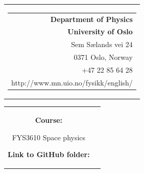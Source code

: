 


% 
{}
\thispagestyle{empty}
\begin{nopagebreak}
{\samepage 
\begin{tabular}{r}
\parbox{\textwidth}{  
\hfill \parbox{5.5cm}{\begin{tabular}{r} %
{\small \textbf{Department of Physics}}\\
{\small  \textbf{University of Oslo}} \\
{\small  Sem S\ae lands vei 24} \\
{\small  0371 Oslo, Norway} \\
{\small +47 22 85 64 28} \\
{\small http://www.mn.uio.no/fysikk/english/}
\end{tabular}}}

\end{tabular}

\vspace{2.5cm}
\begin{tabular}{cc}
\parbox{20cm}{
\begin{description}
\item { \textbf{Course:}}

	FYS3610 Space physics\\
	\hspace{4cm}
	\vspace{0.7cm}


\item {\textbf{Link to GitHub folder:} }


\end{description}}
\end{tabular}}
\end{nopagebreak}
